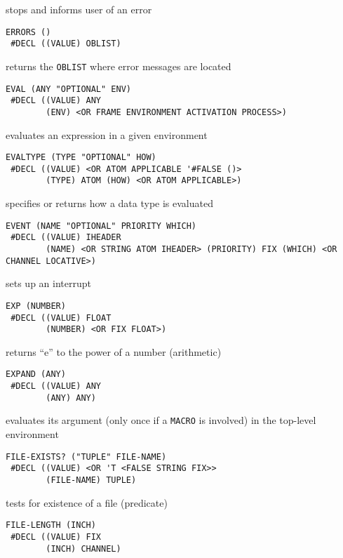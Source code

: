 \documentclass[a4paper,]{article}
\begin{document}
stops and informs user of an error

\begin{verbatim}
ERRORS ()
 #DECL ((VALUE) OBLIST)
\end{verbatim}

returns the \texttt{OBLIST} where error messages are located

\begin{verbatim}
EVAL (ANY "OPTIONAL" ENV)
 #DECL ((VALUE) ANY
        (ENV) <OR FRAME ENVIRONMENT ACTIVATION PROCESS>)
\end{verbatim}

evaluates an expression in a given environment

\begin{verbatim}
EVALTYPE (TYPE "OPTIONAL" HOW)
 #DECL ((VALUE) <OR ATOM APPLICABLE '#FALSE ()>
        (TYPE) ATOM (HOW) <OR ATOM APPLICABLE>)
\end{verbatim}

specifies or returns how a data type is evaluated

\begin{verbatim}
EVENT (NAME "OPTIONAL" PRIORITY WHICH)
 #DECL ((VALUE) IHEADER
        (NAME) <OR STRING ATOM IHEADER> (PRIORITY) FIX (WHICH) <OR CHANNEL LOCATIVE>)
\end{verbatim}

sets up an interrupt

\begin{verbatim}
EXP (NUMBER)
 #DECL ((VALUE) FLOAT
        (NUMBER) <OR FIX FLOAT>)
\end{verbatim}

returns ``e'' to the power of a number (arithmetic)

\begin{verbatim}
EXPAND (ANY)
 #DECL ((VALUE) ANY
        (ANY) ANY)
\end{verbatim}

evaluates its argument (only once if a \texttt{MACRO} is involved) in the top-level environment

\begin{verbatim}
FILE-EXISTS? ("TUPLE" FILE-NAME)
 #DECL ((VALUE) <OR 'T <FALSE STRING FIX>>
        (FILE-NAME) TUPLE)
\end{verbatim}

tests for existence of a file (predicate)

\begin{verbatim}
FILE-LENGTH (INCH)
 #DECL ((VALUE) FIX
        (INCH) CHANNEL)
\end{verbatim}
\end{document}
